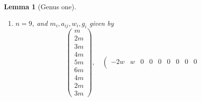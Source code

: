 \documentclass{stacks-project}
\theoremstyle{plain}
\newtheorem{lemma}[subsection]{Lemma}
\theoremstyle{definition}
\theoremstyle{remark}
\numberwithin{equation}{subsection}
\begin{document}
\begin{lemma}[Genus one]
\begin{enumerate}
$$\begin{matrix}
3m \\
2m \\
m \\
2m
\end{matrix}
\right),
\quad
\left(
\begin{matrix}
-2w & w & 0 & 0 & 0 & 0 & 0 & 0 \\
w & -2w & w & 0 & 0 & 0 & 0 & 0 \\
0 & w & -2w & w & 0 & 0 & 0 & 0 \\
0 & 0 & w & -2w & w & 0 & 0 & w \\
0 & 0 & 0 & w & -2w & w & 0 & 0 \\
0 & 0 & 0 & 0 & w & -2w & w & 0 \\
0 & 0 & 0 & 0 & 0 & w & -2w & 0 \\
0 & 0 & 0 & w & 0 & 0 & 0 & -2w \\
\end{matrix}
\right),
\quad
\left(
\begin{matrix}
w \\
w \\
w \\
w \\
w \\
w \\
w \\
w
\end{matrix}
\right),
\quad
\left(
\begin{matrix}
0 \\
0 \\
0 \\
0 \\
0 \\
0 \\
0 \\
0
\end{matrix}
\right)
$$
with $w$ and $m$ arbitrary,
\item
\label{item-E8-completed}
$n = 9$, and $m_i, a_{ij}, w_i, g_i$ given by
$$
\left(
\begin{matrix}
m \\
2m \\
3m \\
4m \\
5m \\
6m \\
4m \\
2m \\
3m
\end{matrix}
\right),
\quad
\left(
\begin{matrix}
-2w & w & 0 & 0 & 0 & 0 & 0 & 0 & 0 \\

\end{matrix}$$
\end{enumerate}
\end{lemma}
\end{document}

